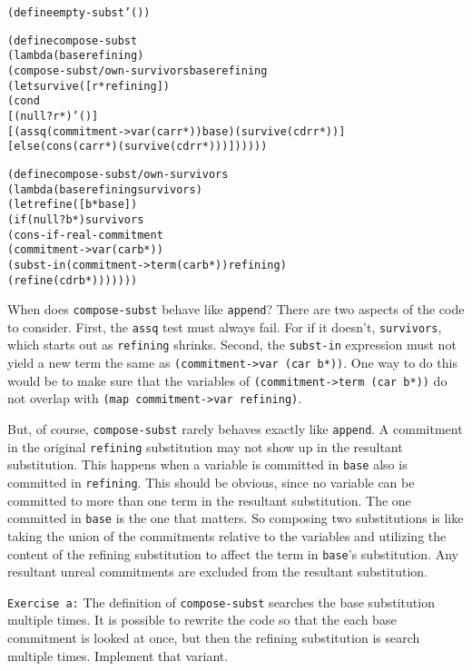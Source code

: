\begin{alltt}
(define empty-subst '())
\end{alltt}

\begin{alltt}
(define compose-subst
  (lambda (base refining)
    (compose-subst/own-survivors base refining
      (let survive ([r* refining])
        (cond
          [(null? r*) '()]
          [(assq (commitment->var (car r*)) base) (survive (cdr r*))]
          [else (cons (car r*) (survive (cdr r*)))])))))

(define compose-subst/own-survivors
  (lambda (base refining survivors)
    (let refine ([b* base])
      (if (null? b*) survivors
          (cons-if-real-commitment
            (commitment->var (car b*))
            (subst-in (commitment->term (car b*)) refining)
            (refine (cdr b*)))))))
\end{alltt}
When does \texttt{compose-subst} behave like \texttt{append}?  There
are two aspects of the code to consider.  First, the \texttt{assq}
test must always fail.  For if it doesn't, \texttt{survivors}, which
starts out as \texttt{refining} shrinks. Second, the \texttt{subst-in}
expression must not yield a new term the same as
\texttt{(commitment->var (car b*))}.  One way to do this would be to
make sure that the variables of \texttt{(commitment->term (car b*))}
do not overlap with \texttt{(map commitment->var refining)}.

But, of course, \texttt{compose-subst} rarely behaves exactly like
\texttt{append}.  A commitment in the original \texttt{refining}
substitution may not show up in the resultant substitution.  This
happens when a variable is committed in \texttt{base} also is
committed in \texttt{refining}.  This should be obvious, since no
variable can be committed to more than one term in the resultant
substitution.  The one committed in \texttt{base} is the one
that matters.  So composing two substitutions is like taking the union
of the commitments relative to the variables and utilizing the content
of the refining substitution to affect the term in \texttt{base}'s
substitution.  Any resultant unreal commitments are excluded from the
resultant substitution.

\texttt{Exercise a:}
The definition of \texttt{compose-subst} searches the base
substitution multiple times.  It is possible to rewrite the
code so that the each base commitment is looked at once, but
then the refining substitution is search multiple times.
Implement that variant.\endofexercise{}

